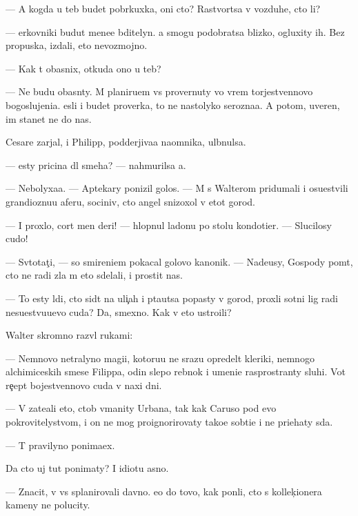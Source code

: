 \documentclass[10pt]{book}
\begin{document}
— A kogda u teb{\ia} budet pobr{\ia}kuxka, oni cto? Rastvor{\ia}tsa v vozduhe, cto li?

— {\C}erkovniki budut mene{\y}e bditelyn{\yi}. {\Y}a smogu podobratsa blizko, ogluxity ih. Bez propuska, izdali, eto nevozmojno.

— Kak t{\yi} ob{\y}asnix, otkuda ono u teb{\ia}?

— Ne budu ob{\y}asn{\ia}ty. M{\yi} planiru{\y}em vs{\e} provernuty vo vrem{\ia} torjestvennovo bogoslujeni{\y}a. {\Y}esli i budet proverka, to ne nastolyko ser{\y}ozna{\y}a. A potom, uveren, im stanet ne do nas.

Cesare zarjal, i Philipp, podderjiva{\y}a na\-{\y}om\-ni\-ka, ul{\yi}bnulsa.

— {\Y}esty pricina dl{\ia} smeha? — nahmurilsa {\y}a.

— Nebolyxa{\y}a. — Aptekary ponizil golos. — M{\yi} s Walterom pridumali i osu\-{\x}estvi\-li grandioznu{\y}u aferu, sociniv, cto angel snizoxol v etot gorod.

— I proxlo, cort men{\ia} deri! — hlopnul ladon{\y}u po stolu kondotier. — Slucilosy cudo!

— Sv{\ia}totat{\c}i, — so smireni{\y}em pokacal go\-lo\-vo{\y} kanonik. — Nade{\y}usy, Gospody po{\y}m{\e}t, cto ne radi zla m{\yi} eto sdelali, i prostit nas.

— To {\y}esty l{\io}di, cto sid{\ia}t na uli{\c}ah i p{\yi}ta{\y}utsa popasty v gorod, proxli sotni lig radi nesu{\x}estvu{\y}u{\x}evo cuda? Da, smexno. Kak v{\yi} eto ustro{\y}ili?

Walter skromno razv{\e}l rukami:

— Nemnovo ne{\y}tralyno{\y} magi{\y}i, kotoru{\y}u ne srazu opredel{\ia}t kleriki, nemnogo alchimiceskih smese{\y} Filippa, odin slepo{\y} reb{\e}nok i umeni{\y}e rasprostran{\ia}ty sluhi. Vot re{\c}ept bojestvennovo cuda v naxi dni.

— V{\yi} zate{\y}ali eto, ctob{\yi} v{\yi}manity Urbana, tak kak Caruso pod {\y}evo po\-kro\-vi\-tely\-stvom, i on ne mog proignorirovaty tako{\y}e sob{\yi}ti{\y}e i ne pri{\y}ehaty s{\io}da.

— T{\yi} pravilyno ponima{\y}ex.

Da cto uj tut ponimaty? I idiotu {\y}asno.

— Znacit, v{\yi} vs{\e} splanirovali davno. {\Y}e{\x}o do tovo, kak pon{\ia}li, cto s kollek{\c}ionera kameny ne polucity.
\end{document}
